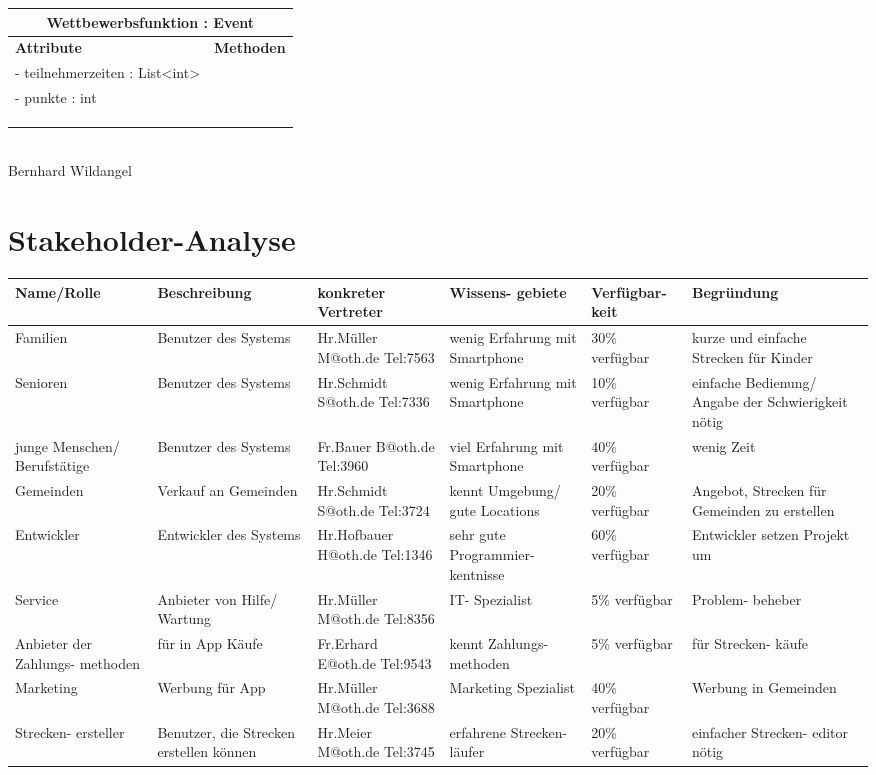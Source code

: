 \documentclass[a4paper, 12pt]{article}
\begin{document}
\begin{tabular}{ | p{5.5cm} | p{8cm} |}
\multicolumn{2}{c}{\textbf{Wettbewerbsfunktion : Event}}\\ \hline
\textbf{Attribute} & \textbf{Methoden} \\ \hline
- teilnehmerzeiten : List<int> &  \\ \hline
- punkte : int &  \\ \hline
 &  \\ \hline
 &  \\ \hline
 &  \\ \hline
\end{tabular}\\[1\baselineskip]

Bernhard Wildangel


\section{Stakeholder-Analyse}

\begin{center}


\begin{tabular}{|p{2cm}|p{2cm}|p{2cm}|p{2cm}|p{2cm}|p{2cm}|}
\hline
Name/Rolle & Beschreibung & konkreter Vertreter & Wissens- gebiete & Verfügbar- keit & Begründung\\ \hline
Familien & Benutzer des Systems & Hr.Müller M@oth.de Tel:7563& wenig Erfahrung mit Smartphone & 30\% verfügbar & kurze und einfache Strecken für Kinder\\ \hline
Senioren & Benutzer des Systems & Hr.Schmidt S@oth.de Tel:7336 & wenig Erfahrung mit Smartphone & 10\% verfügbar & einfache Bedienung/ Angabe der Schwierigkeit nötig\\ \hline
junge Menschen/ Berufstätige & Benutzer des Systems & Fr.Bauer B@oth.de Tel:3960& viel Erfahrung mit Smartphone & 40\% verfügbar & wenig Zeit\\ \hline
Gemeinden & Verkauf an Gemeinden & Hr.Schmidt S@oth.de Tel:3724& kennt Umgebung/ gute Locations & 20\% verfügbar & Angebot, Strecken für Gemeinden zu erstellen\\ \hline
Entwickler & Entwickler des Systems & Hr.Hofbauer H@oth.de Tel:1346& sehr gute Programmier- kentnisse & 60\% verfügbar & Entwickler setzen Projekt um\\ \hline
Service & Anbieter von Hilfe/ Wartung & Hr.Müller M@oth.de Tel:8356& IT- Spezialist & 5\% verfügbar & Problem- beheber\\ \hline
Anbieter der Zahlungs- methoden & für in App Käufe & Fr.Erhard E@oth.de Tel:9543 & kennt Zahlungs- methoden & 5\% verfügbar & für Strecken- käufe\\ \hline
Marketing & Werbung für App & Hr.Müller M@oth.de Tel:3688 & Marketing Spezialist & 40\% verfügbar & Werbung in Gemeinden\\ \hline
Strecken- ersteller & Benutzer, die Strecken erstellen können & Hr.Meier M@oth.de Tel:3745& erfahrene Strecken- läufer & 20\% verfügbar & einfacher Strecken- editor nötig\\ \hline
\hline

\end{tabular}
\end{center}
\end{document}

